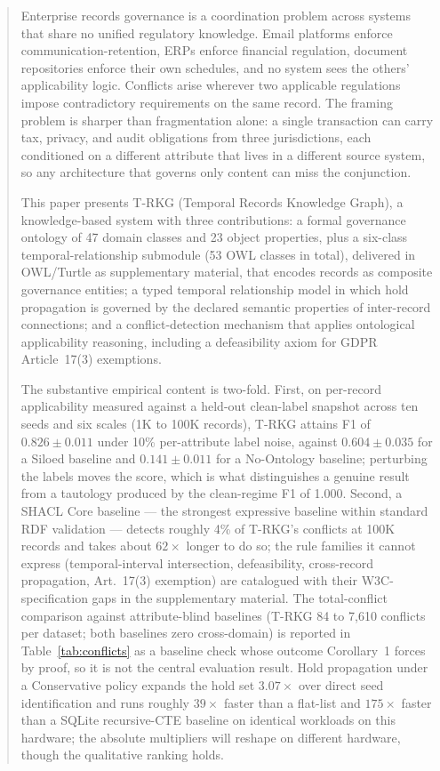 \documentclass{ieeeaccess}
\begin{document}
\begin{abstract}
Enterprise records governance is a coordination problem across systems that share no unified regulatory knowledge. Email platforms enforce communication-retention, ERPs enforce financial regulation, document repositories enforce their own schedules, and no system sees the others' applicability logic. Conflicts arise wherever two applicable regulations impose contradictory requirements on the same record. The framing problem is sharper than fragmentation alone: a single transaction can carry tax, privacy, and audit obligations from three jurisdictions, each conditioned on a different attribute that lives in a different source system, so any architecture that governs only content can miss the conjunction.

This paper presents T-RKG (Temporal Records Knowledge Graph), a knowledge-based system with three contributions: a formal governance ontology of 47 domain classes and 23 object properties, plus a six-class temporal-relationship submodule (53 OWL classes in total), delivered in OWL/Turtle as supplementary material, that encodes records as composite governance entities; a typed temporal relationship model in which hold propagation is governed by the declared semantic properties of inter-record connections; and a conflict-detection mechanism that applies ontological applicability reasoning, including a defeasibility axiom for GDPR Article~17(3) exemptions.

The substantive empirical content is two-fold. First, on per-record applicability measured against a held-out clean-label snapshot across ten seeds and six scales (1K to 100K records), T-RKG attains F1 of $0.826 \pm 0.011$ under 10\% per-attribute label noise, against $0.604 \pm 0.035$ for a Siloed baseline and $0.141 \pm 0.011$ for a No-Ontology baseline; perturbing the labels moves the score, which is what distinguishes a genuine result from a tautology produced by the clean-regime F1 of 1.000. Second, a SHACL Core baseline --- the strongest expressive baseline within standard RDF validation --- detects roughly 4\% of T-RKG's conflicts at 100K records and takes about $62\times$ longer to do so; the rule families it cannot express (temporal-interval intersection, defeasibility, cross-record propagation, Art.~17(3) exemption) are catalogued with their W3C-specification gaps in the supplementary material. The total-conflict comparison against attribute-blind baselines (T-RKG 84 to 7{,}610 conflicts per dataset; both baselines zero cross-domain) is reported in Table~\ref{tab:conflicts} as a baseline check whose outcome Corollary~1 forces by proof, so it is not the central evaluation result. Hold propagation under a Conservative policy expands the hold set $3.07\times$ over direct seed identification and runs roughly $39\times$ faster than a flat-list and $175\times$ faster than a SQLite recursive-CTE baseline on identical workloads on this hardware; the absolute multipliers will reshape on different hardware, though the qualitative ranking holds.
\end{abstract}
\end{document}
